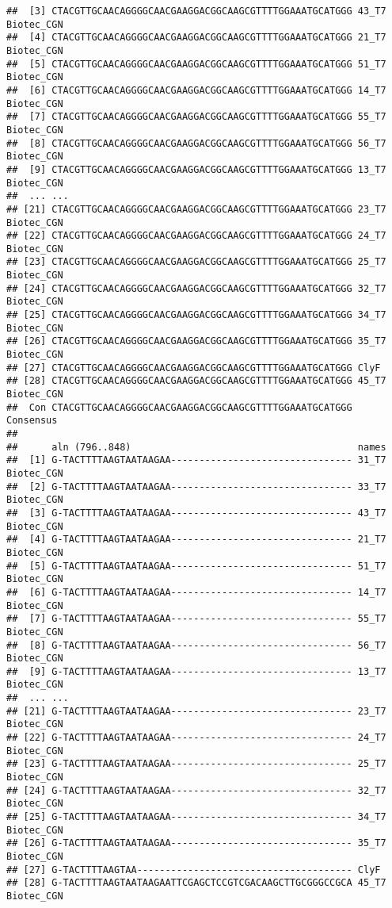 \documentclass[
]{article}
\begin{document}
\begin{verbatim}
##  [3] CTACGTTGCAACAGGGGCAACGAAGGACGGCAAGCGTTTTGGAAATGCATGGG 43_T7 Biotec_CGN
##  [4] CTACGTTGCAACAGGGGCAACGAAGGACGGCAAGCGTTTTGGAAATGCATGGG 21_T7 Biotec_CGN
##  [5] CTACGTTGCAACAGGGGCAACGAAGGACGGCAAGCGTTTTGGAAATGCATGGG 51_T7 Biotec_CGN
##  [6] CTACGTTGCAACAGGGGCAACGAAGGACGGCAAGCGTTTTGGAAATGCATGGG 14_T7 Biotec_CGN
##  [7] CTACGTTGCAACAGGGGCAACGAAGGACGGCAAGCGTTTTGGAAATGCATGGG 55_T7 Biotec_CGN
##  [8] CTACGTTGCAACAGGGGCAACGAAGGACGGCAAGCGTTTTGGAAATGCATGGG 56_T7 Biotec_CGN
##  [9] CTACGTTGCAACAGGGGCAACGAAGGACGGCAAGCGTTTTGGAAATGCATGGG 13_T7 Biotec_CGN 
##  ... ...
## [21] CTACGTTGCAACAGGGGCAACGAAGGACGGCAAGCGTTTTGGAAATGCATGGG 23_T7 Biotec_CGN
## [22] CTACGTTGCAACAGGGGCAACGAAGGACGGCAAGCGTTTTGGAAATGCATGGG 24_T7 Biotec_CGN
## [23] CTACGTTGCAACAGGGGCAACGAAGGACGGCAAGCGTTTTGGAAATGCATGGG 25_T7 Biotec_CGN
## [24] CTACGTTGCAACAGGGGCAACGAAGGACGGCAAGCGTTTTGGAAATGCATGGG 32_T7 Biotec_CGN
## [25] CTACGTTGCAACAGGGGCAACGAAGGACGGCAAGCGTTTTGGAAATGCATGGG 34_T7 Biotec_CGN
## [26] CTACGTTGCAACAGGGGCAACGAAGGACGGCAAGCGTTTTGGAAATGCATGGG 35_T7 Biotec_CGN
## [27] CTACGTTGCAACAGGGGCAACGAAGGACGGCAAGCGTTTTGGAAATGCATGGG ClyF
## [28] CTACGTTGCAACAGGGGCAACGAAGGACGGCAAGCGTTTTGGAAATGCATGGG 45_T7 Biotec_CGN
##  Con CTACGTTGCAACAGGGGCAACGAAGGACGGCAAGCGTTTTGGAAATGCATGGG Consensus 
## 
##      aln (796..848)                                        names
##  [1] G-TACTTTTAAGTAATAAGAA-------------------------------- 31_T7 Biotec_CGN
##  [2] G-TACTTTTAAGTAATAAGAA-------------------------------- 33_T7 Biotec_CGN
##  [3] G-TACTTTTAAGTAATAAGAA-------------------------------- 43_T7 Biotec_CGN
##  [4] G-TACTTTTAAGTAATAAGAA-------------------------------- 21_T7 Biotec_CGN
##  [5] G-TACTTTTAAGTAATAAGAA-------------------------------- 51_T7 Biotec_CGN
##  [6] G-TACTTTTAAGTAATAAGAA-------------------------------- 14_T7 Biotec_CGN
##  [7] G-TACTTTTAAGTAATAAGAA-------------------------------- 55_T7 Biotec_CGN
##  [8] G-TACTTTTAAGTAATAAGAA-------------------------------- 56_T7 Biotec_CGN
##  [9] G-TACTTTTAAGTAATAAGAA-------------------------------- 13_T7 Biotec_CGN 
##  ... ...
## [21] G-TACTTTTAAGTAATAAGAA-------------------------------- 23_T7 Biotec_CGN
## [22] G-TACTTTTAAGTAATAAGAA-------------------------------- 24_T7 Biotec_CGN
## [23] G-TACTTTTAAGTAATAAGAA-------------------------------- 25_T7 Biotec_CGN
## [24] G-TACTTTTAAGTAATAAGAA-------------------------------- 32_T7 Biotec_CGN
## [25] G-TACTTTTAAGTAATAAGAA-------------------------------- 34_T7 Biotec_CGN
## [26] G-TACTTTTAAGTAATAAGAA-------------------------------- 35_T7 Biotec_CGN
## [27] G-TACTTTTAAGTAA-------------------------------------- ClyF
## [28] G-TACTTTTAAGTAATAAGAATTCGAGCTCCGTCGACAAGCTTGCGGGCCGCA 45_T7 Biotec_CGN

\end{verbatim}
\end{document}
